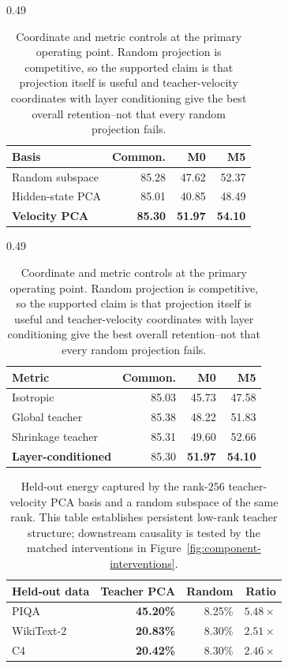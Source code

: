 \documentclass{article}
\theoremstyle{plain}
\theoremstyle{definition}
\theoremstyle{remark}
\begin{document}
\begin{table}[H]
\centering
\begin{subtable}[t]{0.49\linewidth}
\centering\footnotesize
\caption{Coordinate basis with teacher-aware scaling}
\label{tab:app-coordinate-controls}
\setlength{\tabcolsep}{3.4pt}
\begin{tabular}{@{}lrrr@{}}
\toprule
\textbf{Basis} & \textbf{Common.} & \textbf{M0} & \textbf{M5}\\
\midrule
Random subspace & 85.28 & 47.62 & 52.37\\
Hidden-state PCA & 85.01 & 40.85 & 48.49\\
\textbf{Velocity PCA} & \textbf{85.30} & \textbf{51.97} & \textbf{54.10}\\
\bottomrule
\end{tabular}
\end{subtable}\hfill
\begin{subtable}[t]{0.49\linewidth}
\centering\footnotesize
\caption{Metric inside velocity PCA}
\label{tab:app-metric-controls}
\setlength{\tabcolsep}{3.4pt}
\begin{tabular}{@{}lrrr@{}}
\toprule
\textbf{Metric} & \textbf{Common.} & \textbf{M0} & \textbf{M5}\\
\midrule
Isotropic & 85.03 & 45.73 & 47.58\\
Global teacher & 85.38 & 48.22 & 51.83\\
Shrinkage teacher & 85.31 & 49.60 & 52.66\\
\textbf{Layer-conditioned} & 85.30 & \textbf{51.97} & \textbf{54.10}\\
\bottomrule
\end{tabular}
\end{subtable}
\caption{Coordinate and metric controls at the primary operating point.  Random
projection is competitive, so the supported claim is that projection itself is
useful and teacher-velocity coordinates with layer conditioning give the best
overall retention--not that every random projection fails.}
\label{tab:app-coordinate-metric-controls}
\end{table}

\begin{table}[H]
\caption{Held-out energy captured by the rank-$256$ teacher-velocity PCA basis
and a random subspace of the same rank.  This table establishes persistent
low-rank teacher structure; downstream causality is tested by the matched
interventions in Figure~\ref{fig:component-interventions}.}
\label{tab:app-subspace-energy}
\centering
\small
\setlength{\tabcolsep}{9pt}
\renewcommand{\arraystretch}{1.04}
\begin{tabular}{@{}lrrr@{}}
\toprule
\textbf{Held-out data} & \textbf{Teacher PCA} & \textbf{Random} & \textbf{Ratio}\\
\midrule
PIQA & \textbf{45.20\%} & 8.25\% & $5.48\times$\\
WikiText-2 & \textbf{20.83\%} & 8.30\% & $2.51\times$\\
C4 & \textbf{20.42\%} & 8.30\% & $2.46\times$\\
\bottomrule
\end{tabular}
\end{table}
\end{document}
